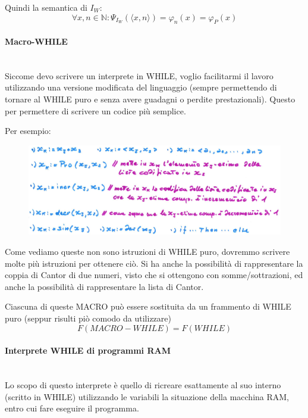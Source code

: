\documentclass{article}
\begin{document}
Quindi la semantica di $I_W$:
$$\forall x,n\in\mathbb{N}:\Psi_{I_W}(\langle x,n\rangle)=\varphi_n(x)=\varphi_P(x)$$

\paragraph{Macro-WHILE}\mbox{}\\
Siccome devo scrivere un interprete in WHILE, voglio facilitarmi il lavoro utilizzando una
versione modificata del linguaggio (sempre permettendo di tornare al WHILE puro e senza
avere guadagni o perdite prestazionali). Questo per permettere di scrivere un codice
più semplice.

Per esempio:
\begin{figure}[H]
    \centering
    \includegraphics[scale=0.5]{images/macro-while.png}
\end{figure}

Come vediamo queste non sono istruzioni di WHILE puro, dovremmo scrivere molte più istruzioni
per ottenere ciò. Si ha anche la possibilità di rappresentare la coppia di Cantor di due numeri,
visto che si ottengono con somme/sottrazioni, ed anche la possibilità di rappresentare la
lista di Cantor.

Ciascuna di queste MACRO può essere sostituita da un frammento di WHILE puro (seppur risulti piò comodo
da utilizzare)
$$F(MACRO-WHILE)=F(WHILE)$$

\paragraph{Interprete WHILE di programmi RAM}\mbox{}\\
Lo scopo di questo interprete è quello di ricreare esattamente al suo interno (scritto
in WHILE) utilizzando le variabili la situazione della macchina RAM, entro cui fare
eseguire il programma.
\end{document}
